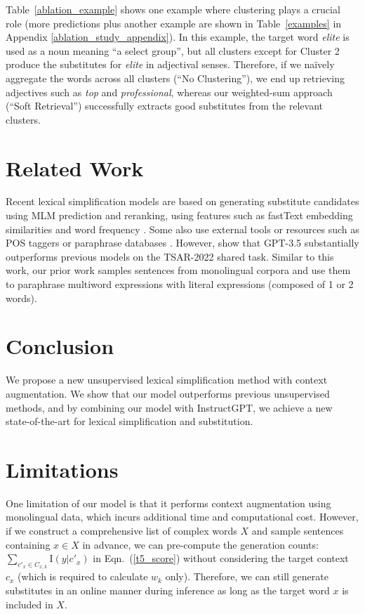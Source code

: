 \documentclass[11pt]{article}
\newcommand{\tabref}[2][]{Table#1~\ref{#2}\xspace}
\newcommand{\eqnref}[2][]{Eqn#1.~(\ref{#2})\xspace}
\newcommand{\ex}[1]{\textit{#1}\xspace}
\begin{document}
\tabref[]{ablation_example} shows one example where clustering plays a crucial role (more predictions plus another example are shown in \tabref{examples} in Appendix \ref{ablation_study_appendix}). In this example, the target word \ex{elite} is used as a noun meaning ``a select group'', but all clusters except for Cluster 2 produce the substitutes for \ex{elite} in adjectival senses. Therefore, if we naïvely aggregate the words across all clusters (``No Clustering''), we end up retrieving adjectives such as \ex{top} and \ex{professional}, whereas our weighted-sum approach (``Soft Retrieval'') successfully extracts good substitutes from the relevant clusters. 

\section{Related Work}
Recent lexical simplification models are based on generating substitute candidates using MLM prediction and reranking, using features such as fastText embedding similarities and word frequency \cite{qiang2020BERTLS,li-etal-2022-mantis}. Some also use external tools or resources such as POS taggers or paraphrase databases \cite{DBLP:journals/corr/abs-2006-14939,whistely-etal-2022-presiuniv}. However, \citet{aumiller-gertz-2022-unihd} show that GPT-3.5 substantially outperforms previous models on the TSAR-2022 shared task. Similar to this work, our prior work \cite{wada-etal-2023-unsupervised} samples sentences from monolingual corpora and use them to paraphrase multiword expressions with literal expressions (composed of 1 or 2 words).



\section{Conclusion}
We propose a new unsupervised lexical simplification method with context augmentation. We show that our model outperforms previous unsupervised methods, and by combining our model with InstructGPT, we achieve a new state-of-the-art for lexical simplification and substitution.

\section{Limitations}\label{sec_limitations}
One limitation of our model is that it performs context augmentation using monolingual data, which incurs additional time and computational cost. However, if we construct a comprehensive list of complex words $X$ and sample sentences containing $x \in X$ in advance, we can pre-compute the generation counts: $\sum_{c'_x \in C_{x,k}}{\mathrm{I}(y|c'_x)}$ in \eqnref{t5_score} without considering the target context $c_x$ (which is required to calculate $w_k$ only). Therefore, we can still generate substitutes in an online manner during inference as long as the target word $x$ is included in $X$. 
\end{document}
